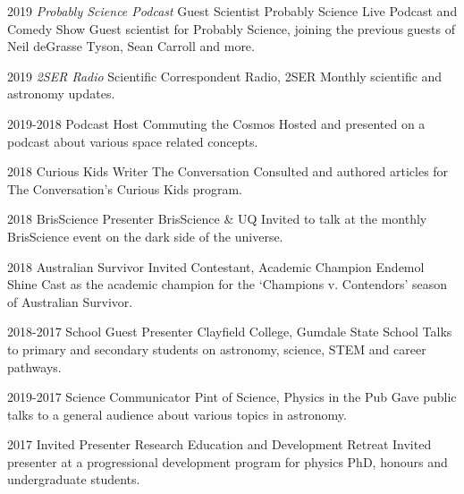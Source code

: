 \begin{entrylist}
\entry
	{2019}
	{\textit{Probably Science Podcast }Guest Scientist}
	{Probably Science Live Podcast and Comedy Show}
	{Guest scientist for Probably Science, joining the previous guests of Neil deGrasse Tyson, Sean Carroll and more.}
\end{entrylist}
\begin{entrylist}
\entry
	{2019}
	{\textit{2SER Radio} Scientific Correspondent}
	{Radio, 2SER}
	{Monthly scientific and astronomy updates.}
\end{entrylist}
\begin{entrylist}
\entry
    {2019-2018}
    {Podcast Host}
    {Commuting the Cosmos}
    {Hosted and presented on a podcast about various space related concepts.}
\end{entrylist}
\begin{entrylist}
\entry
    {2018}
    {Curious Kids Writer}
    {The Conversation}
    {Consulted and authored articles for The Conversation's Curious Kids program.}
\end{entrylist}
\begin{entrylist}
\entry
    {2018}
    {BrisScience Presenter}
    {BrisScience \& UQ}
    {Invited to talk at the monthly BrisScience event on the dark side of the universe.}
\end{entrylist}
\begin{entrylist}
\entry
    {2018}
    {Australian Survivor Invited Contestant, Academic Champion}
    {Endemol Shine}
    {Cast as the academic champion for the `Champions v. Contendors' season of Australian Survivor.}
\end{entrylist}
\begin{entrylist}
\entry
    {2018-2017}
    {School Guest Presenter}
    {Clayfield College, Gumdale State School}
    {Talks to primary and secondary students on astronomy, science, STEM and career pathways.}
\end{entrylist}
\begin{entrylist}
\entry
   {2019-2017}
   {Science Communicator}
   {Pint of Science, Physics in the Pub}
   {Gave public talks to a general audience about various topics in astronomy.}
\end{entrylist}
\begin{entrylist}
\entry
    {2017}
    {Invited Presenter}
    {Research Education and Development Retreat}
    {Invited presenter at a progressional development program for physics PhD, honours and undergraduate students.}
\end{entrylist}
